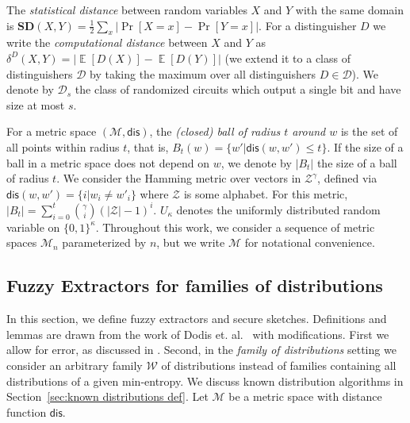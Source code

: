 \documentclass[11pt]{article}
\newcommand{\secref}[1]{\mbox{Section~\ref{#1}}}
\DeclareMathOperator*{\expe}{\mathbb{E}}
\newcommand{\dis}{\ensuremath{\mathsf{dis}}}
\newcommand{\sd}{\ensuremath{\mathbf{SD}}}
\begin{document}
The {\em statistical distance} between random variables $X$ and $Y$ with the same domain is $\sd(X,Y) = \frac12 \sum_x |\Pr[X=x] - \Pr[Y=x]|$.
For a distinguisher $D$ we write the \emph{computational distance} between $X$ and $Y$ as $\delta^D(X,Y) = \left| \expe[D(X)]-\expe[D(Y)]\right |$ (we extend it to a class of distinguishers $\mathcal{D}$ by taking the maximum over all distinguishers $D\in\mathcal{D}$).  We denote by $\mathcal{D}_{s}$ the class of randomized circuits which output a single bit and have size at most $s$.

For a metric space $(\mathcal{M}, \dis)$, the \emph{(closed) ball of radius $t$ around $w$} is the set of all points within radius $t$, that is, $B_t(w) = \{w'| \dis(w, w')\leq t\}$.  If the size of a ball in a metric space does not depend on $w$, we denote by $|B_t|$ the size of a ball of radius $t$.  We consider the Hamming metric over vectors in $\mathcal{Z}^\gamma$, defined via $\dis(w,w') = \{i | w_i \neq w'_i\}$ where $\mathcal{Z}$ is some alphabet.  For this metric, $|B_t| = \sum_{i=0}^t {\gamma \choose i} (|\mathcal{Z}|-1)^i $.  $U_\kappa$ denotes the uniformly  distributed random variable on $\{0,1\}^\kappa$.  Throughout this work, we consider a sequence of metric spaces $\mathcal{M}_n$ parameterized by $n$, but we write $\mathcal{M}$ for notational convenience.

\subsection{Fuzzy Extractors for families of distributions}\label{sec:fuzz extractor}

In this section, we define fuzzy extractors and secure sketches.  Definitions and lemmas are drawn from the work of Dodis et. al.~\cite[Sections 2.5--4.1]{DBLP:journals/siamcomp/DodisORS08} with modifications.  First we allow for error, as discussed in \cite[Section 8]{DBLP:journals/siamcomp/DodisORS08}.  Second, in the \emph{family of distributions} setting we consider an arbitrary family $\mathcal{W}$ of distributions instead of families containing all distributions of a given min-entropy.
We discuss known distribution algorithms in \secref{sec:known distributions def}.  Let $\mathcal{M}$ be a metric space with distance function $\dis$.
\end{document}
